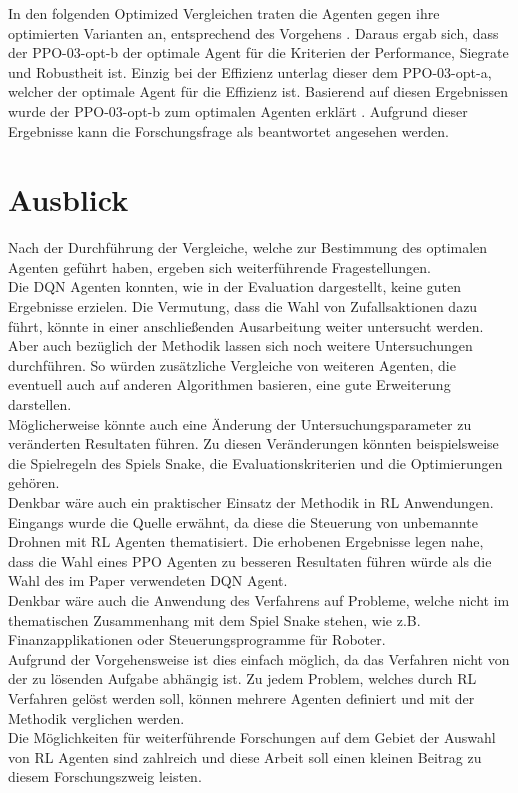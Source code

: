 In den folgenden Optimized Vergleichen traten die Agenten gegen ihre optimierten Varianten an, entsprechend des Vorgehens .
Daraus ergab sich, dass der PPO-03-opt-b der optimale Agent für die Kriterien der Performance, Siegrate und Robustheit ist. Einzig bei der Effizienz unterlag dieser dem PPO-03-opt-a, welcher der optimale Agent für die Effizienz ist. Basierend auf diesen Ergebnissen wurde der PPO-03-opt-b zum optimalen Agenten erklärt .
Aufgrund dieser Ergebnisse kann die Forschungsfrage als beantwortet angesehen werden.

\section{Ausblick}
Nach der Durchführung der Vergleiche, welche zur Bestimmung des optimalen Agenten geführt haben, ergeben sich weiterführende Fragestellungen.\\
Die DQN Agenten konnten, wie in der Evaluation dargestellt, keine guten Ergebnisse erzielen. Die Vermutung, dass die Wahl von Zufallsaktionen dazu führt, könnte in einer anschließenden Ausarbeitung weiter untersucht werden.\\
Aber auch bezüglich der Methodik lassen sich noch weitere Untersuchungen durchführen. 
So würden zusätzliche Vergleiche von weiteren Agenten, die eventuell auch auf anderen Algorithmen basieren, eine gute Erweiterung darstellen.\\
Möglicherweise könnte auch eine Änderung der Untersuchungsparameter zu veränderten Resultaten führen. Zu diesen Veränderungen könnten beispielsweise die Spielregeln des Spiels Snake, die Evaluationskriterien und die Optimierungen gehören.\\
Denkbar wäre auch ein praktischer Einsatz der Methodik in RL Anwendungen. Eingangs wurde die Quelle \cite{UAV} erwähnt, da diese die Steuerung von unbemannte Drohnen mit RL Agenten thematisiert. Die erhobenen Ergebnisse legen nahe, dass die Wahl eines PPO Agenten zu besseren Resultaten führen würde als die Wahl des im Paper verwendeten DQN Agent.\\
Denkbar wäre auch die Anwendung des Verfahrens auf Probleme, welche nicht im thematischen Zusammenhang mit dem Spiel Snake stehen, wie z.B. Finanzapplikationen oder Steuerungsprogramme für Roboter.\\
Aufgrund der Vorgehensweise ist dies einfach möglich, da das Verfahren nicht von der zu lösenden Aufgabe abhängig ist. Zu jedem Problem, welches durch RL Verfahren gelöst werden soll, können mehrere Agenten definiert und mit der Methodik verglichen werden.\\
Die Möglichkeiten für weiterführende Forschungen auf dem Gebiet der Auswahl von RL Agenten sind zahlreich und diese Arbeit soll einen kleinen Beitrag zu diesem Forschungszweig leisten.